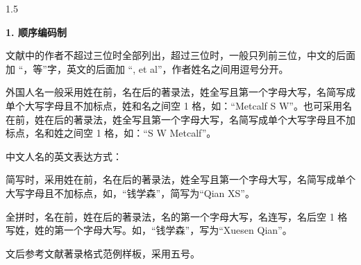 \documentclass[UTF8, scheme=chinese, openany, oneside]{ctexbook}
\renewcommand{\headrulewidth}{0.4pt}
\renewcommand{\headrule}{%
        \hrule width\headwidth height\headrulewidth\vskip 2pt%
        \hrule width\headwidth height\headrulewidth%
    }
\renewcommand{\headrulewidth}{0.4pt}
\renewcommand{\headrule}{%
        \hrule width\headwidth height\headrulewidth\vskip 2pt%
        \hrule width\headwidth height\headrulewidth%
    }
\renewcommand{\headrulewidth}{0.4pt}
\renewcommand{\headrule}{%
        \hrule width\headwidth height\headrulewidth\vskip 2pt%
        \hrule width\headwidth height\headrulewidth%
    }
\renewcommand{\headrulewidth}{0.4pt}
\renewcommand{\headrulewidth}{0.4pt}
\renewcommand{\headrulewidth}{0.4pt}
\renewcommand{\headrulewidth}{0.6pt}
\renewcommand{\headrulewidth}{0.6pt}
\begin{document}
\begin{spacing}{1.5}

\vspace{0.3cm}
\noindent \textbf{1. 顺序编码制}

\vspace{0.3cm}
\noindent 文献中的作者不超过三位时全部列出，超过三位时，一般{\color{blue}只列前三位}，中文的后面加 {\color{blue}“，等”}字，英文的后面加 {\color{blue}“, et al”}，作者姓名之间用{\color{blue}逗号}分开。

\vspace{0.3cm}
\noindent 外国人名一般采用{\color{blue}姓在前，名在后}的著录法，{\color{blue}姓全写且第一个字母大写，名简写成单个大写字母且不加标点}，姓和名之间空 1 格，如：“{\color{blue}Metcalf S W}”。也可采用名在前，姓在后的著录法，姓全写且第一个字母大写，名简写成单个大写字母且不加标点，名和姓之间空 1 格，如：“{\color{blue}S W Metcalf}”。

\vspace{0.3cm}
\noindent 中文人名的英文表达方式：

\vspace{0.3cm}
\noindent 简写时，采用{\color{blue}姓在前，名在后}的著录法，{\color{blue}姓全写且第一个字母大写，名简写成单个大写字母且不加标点}，如，“钱学森”，简写为“{\color{blue}Qian XS}”。

\vspace{0.3cm}
\noindent 全拼时，{\color{blue}名在前，姓在后}的著录法，名的第一个字母大写，名连写，名后空 1 格写姓，姓的第一个字母大写。如，“钱学森”，写为“{\color{blue}Xuesen Qian}”。

\vspace{0.3cm}
\noindent 文后参考文献著录格式{\color{blue}范例样板}，采用五号。
\end{spacing}


\clearpage
\thispagestyle{refdoublelinestyle}
\pagestyle{refdoublelinestyle}

\fancyhf{}
\fancyfoot[C]{}
\renewcommand{\headrulewidth}{0.4pt}
\renewcommand{\headrule}{%
    \hrule width\headwidth height\headrulewidth\vskip 2pt%
    \hrule width\headwidth height\headrulewidth%
}
\end{document}
